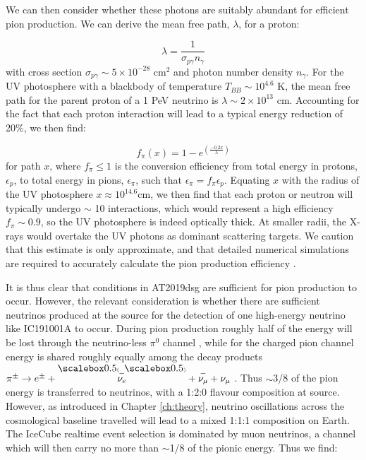 We can then consider whether these photons are suitably abundant for efficient pion production. We can derive the mean free path, $\lambda$, for a proton:

\begin{equation}
\lambda = \frac{1}{\sigma_{p\gamma} n_{\gamma}}
\end{equation} with cross section $\sigma_{p\gamma} \sim 5 \times 10^{-28}$ cm$^{2}$ and photon number density $n_{\gamma}$. For the UV photosphere with a blackbody of temperature $T_{BB} \sim 10^{4.6}$ K, the mean free path for the parent proton of a 1 PeV neutrino is $\lambda \sim 2 \times 10^{13}$ cm. Accounting for the fact that each proton interaction will lead to a typical energy reduction of 20\%, we then find:

\begin{equation}
f_{\pi}(x) = 1 - e^{\left( \frac{-0.2x}{\lambda} \right)}
\end{equation} for path $x$, where $f_{\pi} \leq1$ is the conversion efficiency from total energy in protons, $\epsilon_{p}$, to total energy in pions, $\epsilon_{\pi}$, such that $\epsilon_{\pi} = f_{\pi} \epsilon_{p}$. Equating $x$ with the radius of the UV photosphere $x \approx 10^{14.6}$cm, we then find that each proton or neutron will typically undergo $\sim$ 10 interactions, which would represent a high efficiency $f_{\pi} \sim 0.9$, so the UV photosphere is indeed optically thick. At smaller radii, the X-rays would overtake the UV photons as dominant scattering targets. We caution that this estimate is only approximate, and that detailed numerical simulations are required to accurately calculate the pion production efficiency .


It is thus clear that conditions in AT2019dsg are sufficient for pion production to occur. However, the relevant consideration is whether there are sufficient neutrinos produced at the source for the detection of one high-energy neutrino like IC191001A to occur. During pion production roughly half of the energy will be lost through the neutrino-less $\pi^{0}$ channel \cite{2010ApJ...721..630H}, while for the charged pion channel energy is shared roughly equally among the decay products $\pi^{\pm} \rightarrow e^{\pm} + \overset{\brobor}{\nu_{e}} + \overset{-}{\nu_{\mu}} + \nu_{\mu}$ . Thus $\sim$3/8 of the pion energy is transferred to neutrinos, with a 1:2:0 flavour composition at source. However, as introduced in Chapter \ref{ch:theory}, neutrino oscillations across the cosmological baseline travelled will lead to a mixed 1:1:1 composition on Earth. The IceCube realtime event selection is dominated by muon neutrinos, a channel which will then carry no more than $\sim$1/8 of the pionic energy. Thus we find:

